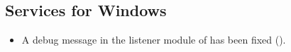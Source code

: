 
 



\subsection{Services for Windows}
\begin{itemize}
\item A debug message in the listener module of
 has been fixed
().
\end{itemize}

%

